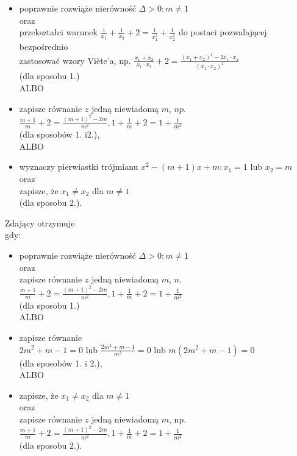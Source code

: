 \documentclass[10pt]{article}
\begin{document}
\begin{itemize}
  \item poprawnie rozwiąże nierówność $\Delta>0: m \neq 1$\\
oraz\\
przekształci warunek $\frac{1}{x_{1}}+\frac{1}{x_{2}}+2=\frac{1}{x_{1}^{2}}+\frac{1}{x_{2}^{2}}$ do postaci pozwalającej bezpośrednio\\
zastosować wzory Viète'a, np. $\frac{x_{1}+x_{2}}{x_{1} \cdot x_{2}}+2=\frac{\left(x_{1}+x_{2}\right)^{2}-2 x_{1} \cdot x_{2}}{\left(x_{1} \cdot x_{2}\right)^{2}}$\\
(dla sposobu 1.)\\
ALBO
  \item zapisze równanie $z$ jedną niewiadomą $m$, $n p$.\\
$\frac{m+1}{m}+2=\frac{(m+1)^{2}-2 m}{m^{2}}, 1+\frac{1}{m}+2=1+\frac{1}{m^{2}}$\\
(dla sposobów 1. i2.),\\
ALBO
  \item wyznaczy pierwiastki trójmianu $x^{2}-(m+1) x+m: x_{1}=1$ lub $x_{2}=m$\\
oraz\\
zapisze, że $x_{1} \neq x_{2}$ dla $m \neq 1$\\
(dla sposobu 2.).
\end{itemize}

Zdający otrzymuje\\
gdy:

\begin{itemize}
  \item poprawnie rozwiąże nierówność $\Delta>0: m \neq 1$\\
oraz\\
zapisze równanie $z$ jedną niewiadomą $m$, $n$.\\
$\frac{m+1}{m}+2=\frac{(m+1)^{2}-2 m}{m^{2}}, 1+\frac{1}{m}+2=1+\frac{1}{m^{2}}$\\
(dla sposobu 1.)\\
ALBO
  \item zapisze równanie\\
$2 m^{2}+m-1=0$ lub $\frac{2 m^{2}+m-1}{m^{2}}=0$ lub $m\left(2 m^{2}+m-1\right)=0$\\
(dla sposobów 1. i 2.),\\
ALBO
  \item zapisze, że $x_{1} \neq x_{2}$ dla $m \neq 1$\\
oraz\\
zapisze równanie $z$ jedną niewiadomą $m$, np.\\
$\frac{m+1}{m}+2=\frac{(m+1)^{2}-2 m}{m^{2}}, 1+\frac{1}{m}+2=1+\frac{1}{m^{2}}$\\
(dla sposobu 2.).
\end{itemize}
\end{document}
